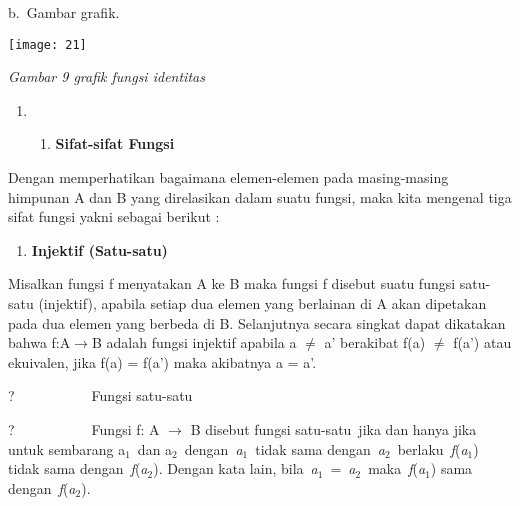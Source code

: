 \documentclass[11pt,fleqn]{book} %
\begin{document}
\noindent 

\noindent 

\noindent 

\noindent 

\noindent 

\noindent 

\noindent 

\noindent 

\noindent b.~Gambar grafik.

\begin{center}
\noindent \texttt{[image: 21]}
\end{center}

\textit{Gambar 9 grafik fungsi identitas}

\noindent 

\begin{enumerate}
\item \begin{enumerate}
\item  \textbf{Sifat-sifat Fungsi}
\end{enumerate}
\end{enumerate}

Dengan memperhatikan bagaimana elemen-elemen pada masing-masing himpunan A dan B yang direlasikan dalam suatu fungsi, maka kita mengenal tiga sifat fungsi yakni sebagai berikut :



\begin{enumerate}
\item  \textbf{Injektif (Satu-satu)}
\end{enumerate}

\noindent 

\noindent Misalkan fungsi f menyatakan A ke B maka fungsi f disebut suatu fungsi satu-satu (injektif), apabila setiap dua elemen yang berlainan di A akan dipetakan pada dua elemen yang berbeda di B. Selanjutnya secara singkat dapat dikatakan bahwa f:A$\mathrm{\to}$B adalah fungsi injektif apabila a $\mathrm{\neq}$ a' berakibat f(a) $\mathrm{\neq}$ f(a') atau ekuivalen, jika f(a) = f(a') maka akibatnya a = a'.

\noindent 

\noindent ?~~~~~~~~~~~Fungsi satu-satu

\noindent ?~~~~~~~~~~~Fungsi f: A $\mathrm{\to}$ B disebut fungsi satu-satu~jika dan hanya jika untuk sembarang a${}_{1}$~dan a${}_{2}$~dengan~\textit{a${}_{1}$}~tidak sama dengan~\textit{a${}_{2}$}~berlaku~\textit{f}(\textit{a${}_{1}$}) tidak sama dengan~\textit{f}(\textit{a${}_{2}$}). Dengan kata lain, bila~\textit{a${}_{1}$}~=~\textit{a${}_{2}$}~maka~\textit{f}(\textit{a${}_{1}$}) sama dengan~\textit{f}(\textit{a${}_{2}$}).
\end{document}
